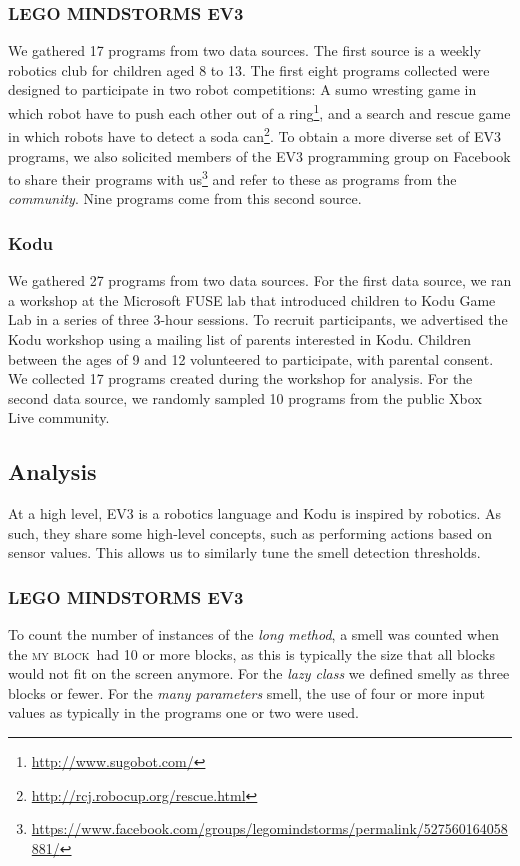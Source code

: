 \documentclass[conference]{IEEEtran}
\newcommand{\ms}{LEGO MINDSTORMS EV3}
\newcommand{\mb}{\textsc{my block}}
\begin{document}
\subsubsection{\ms}
We  gathered 17 programs from two data sources. The first source is a weekly robotics club for children aged 8 to 13. The first eight programs collected were designed to participate in two robot competitions:  A sumo wresting game in which robot have to push each other out of a ring\footnote{\url{http://www.sugobot.com/}}, and a search and rescue game in which robots have to detect a soda can\footnote{\url{http://rcj.robocup.org/rescue.html}}. To obtain a more diverse set of EV3 programs, we also solicited members of the EV3 programming group on Facebook to share their programs with us\footnote{\url{https://www.facebook.com/groups/legomindstorms/permalink/527560164058881/}} and refer to these as programs from the \emph{community}. Nine programs come from this second source. 


\subsubsection{Kodu}
We gathered 27  programs from two data sources. 
For the first data source, we ran a workshop at the Microsoft FUSE lab that introduced children to Kodu Game Lab in a series of three 3-hour sessions.  To recruit participants, we advertised the Kodu workshop using a mailing list of parents interested in Kodu.  
Children between the ages of 9 and 12 volunteered to participate, with parental consent. We collected 17 programs created during the workshop for analysis. 
For the second data source, we randomly sampled 10 programs from the public Xbox Live community. 



\subsection{Analysis}
At a high level, EV3 is a robotics language and Kodu is inspired by robotics. As such, they share some high-level concepts, such as performing actions based on sensor values. This allows us to similarly tune the smell detection thresholds. 

\subsubsection{\ms}
To count the number of instances of the \emph{long method}, a smell was counted when the \mb~had 10 or more blocks, as this is typically the size that all blocks would not fit on the screen anymore. For the \emph{lazy class} we defined smelly as three blocks or fewer. For the  \emph{many parameters} smell, the use of four or more input values as typically in the programs one or two were used.
\end{document}
